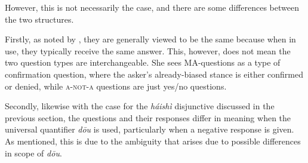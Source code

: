 \documentclass[12pt, UTF8]{article}
\begin{document}
However, this is not necessarily the case, and there are some differences between the two structures.

Firstly, as noted by \cite{Liing2014}, they are generally viewed to be the same because when in use, they typically receive the same answer. This, however, does not mean the two question types are interchangeable. She sees MA-questions as a type of confirmation question, where the asker's already-biased stance is either confirmed or denied, while \textsc{a-not-a} questions are just yes/no questions.

Secondly, likewise with the case for the \textit{h\'{a}ish\`{i}} disjunctive discussed in the previous section, the questions and their responses differ in meaning when the universal quantifier \textit{d\={o}u} is used, particularly when a negative response is given. \citep{McCawley1994} As mentioned, this is due to the ambiguity that arises due to possible differences in scope of \textit{d\={o}u}. 

%
%
%	
%	
%		
%		
%	
%			
%			
%		
%			
%			
%
%
%
\end{document}

